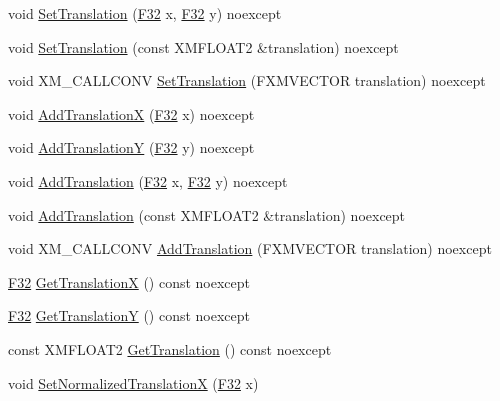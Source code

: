 \begin{DoxyCompactItemize}
\item 
void \hyperlink{structmage_1_1_sprite_transform_a9fb2d4e0f332c316c8f2d07f482f40a5}{Set\+Translation} (\hyperlink{namespacemage_aa97e833b45f06d60a0a9c4fc22ae02c0}{F32} x, \hyperlink{namespacemage_aa97e833b45f06d60a0a9c4fc22ae02c0}{F32} y) noexcept
\item 
void \hyperlink{structmage_1_1_sprite_transform_ad5429c09032b52459ac1840ad07290f4}{Set\+Translation} (const X\+M\+F\+L\+O\+A\+T2 \&translation) noexcept
\item 
void X\+M\+\_\+\+C\+A\+L\+L\+C\+O\+NV \hyperlink{structmage_1_1_sprite_transform_a597ef325d25183a969915be48d0a99f7}{Set\+Translation} (F\+X\+M\+V\+E\+C\+T\+OR translation) noexcept
\item 
void \hyperlink{structmage_1_1_sprite_transform_a040bd05b911dbe199c3eab6f6811ce5b}{Add\+TranslationX} (\hyperlink{namespacemage_aa97e833b45f06d60a0a9c4fc22ae02c0}{F32} x) noexcept
\item 
void \hyperlink{structmage_1_1_sprite_transform_ab45b391a7bdc357facd0eb322e0a294f}{Add\+TranslationY} (\hyperlink{namespacemage_aa97e833b45f06d60a0a9c4fc22ae02c0}{F32} y) noexcept
\item 
void \hyperlink{structmage_1_1_sprite_transform_a567a3bd6476151f65d8ca62f818bba45}{Add\+Translation} (\hyperlink{namespacemage_aa97e833b45f06d60a0a9c4fc22ae02c0}{F32} x, \hyperlink{namespacemage_aa97e833b45f06d60a0a9c4fc22ae02c0}{F32} y) noexcept
\item 
void \hyperlink{structmage_1_1_sprite_transform_a257e6a9e0d7762963813c00c8ba2517c}{Add\+Translation} (const X\+M\+F\+L\+O\+A\+T2 \&translation) noexcept
\item 
void X\+M\+\_\+\+C\+A\+L\+L\+C\+O\+NV \hyperlink{structmage_1_1_sprite_transform_a38ce964e75aca33eac312a995d142495}{Add\+Translation} (F\+X\+M\+V\+E\+C\+T\+OR translation) noexcept
\item 
\hyperlink{namespacemage_aa97e833b45f06d60a0a9c4fc22ae02c0}{F32} \hyperlink{structmage_1_1_sprite_transform_a27f93a491eed09c33f1ac547df011867}{Get\+TranslationX} () const noexcept
\item 
\hyperlink{namespacemage_aa97e833b45f06d60a0a9c4fc22ae02c0}{F32} \hyperlink{structmage_1_1_sprite_transform_a45ac68b47fb751b8c3908524177c37c8}{Get\+TranslationY} () const noexcept
\item 
const X\+M\+F\+L\+O\+A\+T2 \hyperlink{structmage_1_1_sprite_transform_ae8103fdc37f52d294d3703709949a30c}{Get\+Translation} () const noexcept
\item 
void \hyperlink{structmage_1_1_sprite_transform_ab7b14055dc7dbd47e28881a1c46a7522}{Set\+Normalized\+TranslationX} (\hyperlink{namespacemage_aa97e833b45f06d60a0a9c4fc22ae02c0}{F32} x)

\end{DoxyCompactItemize}
